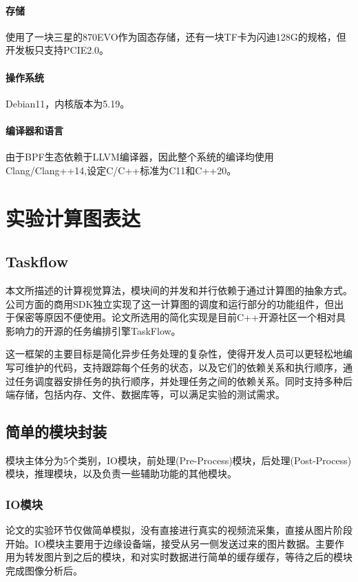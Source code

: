 \documentclass[master,anonymous]{shtthesis}
\begin{document}
\paragraph{存储}使用了一块三星的870EVO作为固态存储，还有一块TF卡为闪迪128G的规格，但开发板只支持PCIE2.0。

\paragraph{操作系统}Debian11，内核版本为5.19。

\paragraph{编译器和语言}由于BPF生态依赖于LLVM编译器，因此整个系统的编译均使用Clang/Clang++14,设定C/C++标准为C11和C++20。

\section{实验计算图表达}
\subsection{Taskflow}
本文所描述的计算视觉算法，模块间的并发和并行依赖于通过计算图的抽象方式。公司方面的商用SDK独立实现了这一计算图的调度和运行部分的功能组件，但出于保密等原因不便使用。论文所选用的简化实现是目前C++开源社区一个相对具影响力的开源的任务编排引擎TaskFlow\cite{huang2019cpp}。

这一框架的主要目标是简化异步任务处理的复杂性，使得开发人员可以更轻松地编写可维护的代码，支持跟踪每个任务的状态，以及它们的依赖关系和执行顺序，通过任务调度器安排任务的执行顺序，并处理任务之间的依赖关系。同时支持多种后端存储，包括内存、文件、数据库等，可以满足实验的测试需求。

\subsection{简单的模块封装}
模块主体分为5个类别，IO模块，前处理(Pre-Process)模块，后处理(Post-Process)模块，推理模块，以及负责一些辅助功能的其他模块。
\subsubsection{IO模块}
论文的实验环节仅做简单模拟，没有直接进行真实的视频流采集，直接从图片阶段开始。IO模块主要用于边缘设备端，接受从另一侧发送过来的图片数据。主要作用为转发图片到之后的模块，和对实时数据进行简单的缓存缓存，等待之后的模块完成图像分析后。
\end{document}
